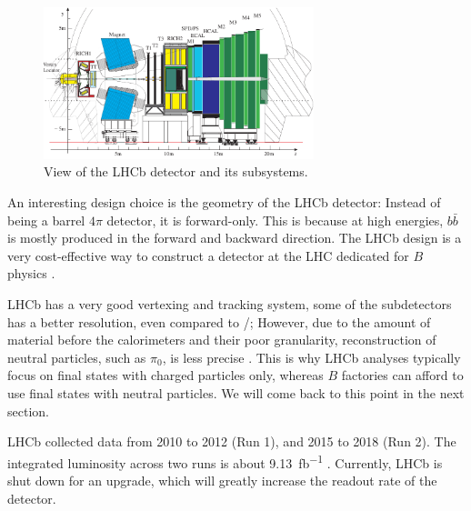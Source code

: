 \begin{figure}[ht]
    \centering
    \includegraphics[width=0.7\textwidth]{figs/lhcb_detector_view.pdf}
    \caption{
        View of the LHCb detector and its subsystems.
    }
    \label{fig:lhcb_detector_view}
\end{figure}

An interesting design choice is the geometry of the LHCb detector:
Instead of being a barrel $4\pi$ detector, it is forward-only.
This is because at high energies, $b\bar{b}$ is mostly produced in the forward
and backward direction.
The LHCb design is a very cost-effective way to construct a detector at the LHC
dedicated for $B$ physics \cite{LHCb:2008}.

LHCb has a very good vertexing and tracking system, some of the subdetectors has
a better resolution, even compared to \BaBar/;
However, due to the amount of material before the calorimeters and their poor granularity,
reconstruction of neutral particles, such as $\pi_0$, is less 
precise \cite{LHCb:2008,Guz:2017}.
This is why LHCb analyses typically focus on final states with charged particles
only, whereas $B$ factories can afford to use final states with neutral particles.
We will come back to this point in the next section.

LHCb collected data from 2010 to 2012 (Run 1), and 2015 to 2018 (Run 2).
The integrated luminosity across two runs is about
\SI{9.13}{fb^{-1}} \cite{LHCb-Lumi:2019}.
Currently, LHCb is shut down for an upgrade, which will greatly increase the
readout rate of the detector.


